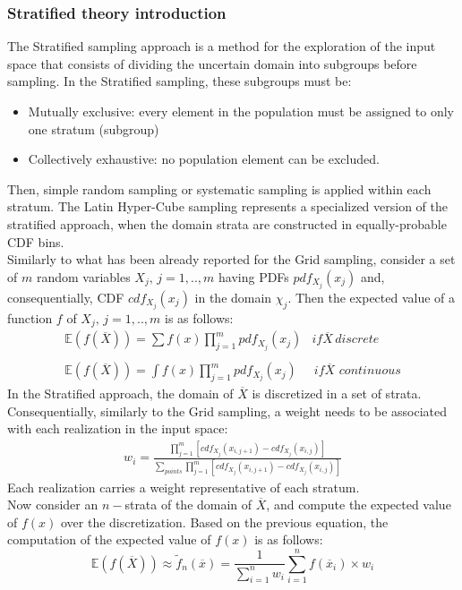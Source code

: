 \subsubsection{Stratified theory introduction}
\label{subsub:Stratifiedtheory}
The Stratified sampling approach is a method for the exploration of the input space that consists of dividing the uncertain domain into subgroups before sampling. In the Stratified sampling, these subgroups must be:
\begin{itemize}
  \item Mutually exclusive: every element in the population must be assigned to only one stratum (subgroup)
  \item Collectively exhaustive: no population element can be excluded.
\end{itemize}
Then, simple random sampling or systematic sampling is applied within each stratum. The Latin Hyper-Cube sampling represents a specialized version of the stratified approach, when the domain strata are constructed in equally-probable CDF bins.
\\Similarly to what has been already reported for the Grid sampling, consider a set of  $m$ random variables $X_{j}, \, j=1,..,m$ having PDFs $pdf_{X_{j}}(x_{j})$ and, consequentially, CDF $cdf_{X_{j}}(x_{j})$ in the domain $\chi_{j}$. Then the expected value of a function $f$ of $X_{j}, \, j=1,..,m$ is as follows:
\begin{equation}
\begin{matrix}
\mathbb{E}(f(\overline{X})) =\sum f(x)   \prod_{j=1}^{m} pdf_{X_{j}}(x_{j}) & if \overline{X} \, discrete \\ 
\\ 
\mathbb{E}(f(\overline{X})) =\int f(x)\prod_{j=1}^{m} pdf_{X_{j}}(x_{j}) & \, if \overline{X} \, \, continuous
\end{matrix}
\end{equation}
In the Stratified approach, the domain of $\overline{X}$ is discretized in a set of strata. Consequentially, similarly to the Grid sampling, a weight needs to be associated with each realization in the input space:
\begin{equation}
\begin{matrix}
  w_{i}= \frac{\prod_{j=1}^{m} \left [  cdf_{X_{j}}(x_{i,j+1}) - cdf_{X_{j}}(x_{i,j}) \right ]}{\sum_{points}\prod_{j=1}^{m} \left [  cdf_{X_{j}}(x_{i,j+1}) - cdf_{X_{j}}(x_{i,j}) \right ]}
\end{matrix}  
\end{equation}
Each realization carries a weight representative of each stratum.
\\Now consider 
an $n-$strata of the domain of  $\overline{X}$, and compute the expected value of $f(x)$ over the discretization. Based on the previous equation, the computation of the expected value of $f(x)$ is as follows:
\begin{equation}
 \mathbb{E}(f(\overline{X})) \approx   \widetilde{f}_{n}(\overline{x}) = \frac{1}{\sum_{i=1}^{n}w_{i}} \sum_{i=1}^{n} f(\overline{x}_{i}) \times w_{i}
\end{equation}
